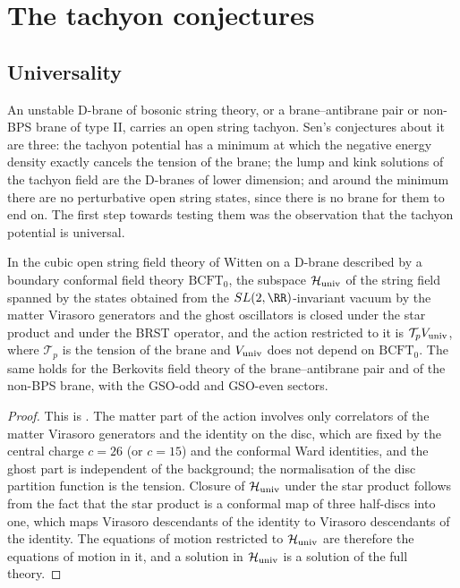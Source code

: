 \section{The tachyon conjectures}\label{sec:tachyon}

\subsection{Universality}\label{ssec:universality}

An unstable D-brane of bosonic string theory, or a brane--antibrane pair or non-BPS brane of type II, carries an open string tachyon. Sen's conjectures about it \cite{Sen98bab,Sen99nonBPS} are three: the tachyon potential has a minimum at which the negative energy density exactly cancels the tension of the brane; the lump and kink solutions of the tachyon field are the D-branes of lower dimension; and around the minimum there are no perturbative open string states, since there is no brane for them to end on. The first step towards testing them was the observation \cite{Sen99univ} that the tachyon potential is universal.

\begin{theorem}\label{thm:universality}
In the cubic open string field theory of Witten on a D-brane described by a boundary conformal field theory $\mathrm{BCFT}_0$, the subspace $\mathcal H_{\rm univ}$ of the string field spanned by the states obtained from the $SL(2,\RR)$-invariant vacuum by the matter Virasoro generators and the ghost oscillators is closed under the star product and under the BRST operator, and the action restricted to it is $\mathcal T_p V_{\rm univ}$, where $\mathcal T_p$ is the tension of the brane and $V_{\rm univ}$ does not depend on $\mathrm{BCFT}_0$. The same holds for the Berkovits field theory of the brane--antibrane pair and of the non-BPS brane, with the GSO-odd and GSO-even sectors.
\end{theorem}

\begin{proof}
This is \cite[Sections~2 and~3]{Sen99univ}. The matter part of the action involves only correlators of the matter Virasoro generators and the identity on the disc, which are fixed by the central charge $c=26$ (or $c=15$) and the conformal Ward identities, and the ghost part is independent of the background; the normalisation of the disc partition function is the tension. Closure of $\mathcal H_{\rm univ}$ under the star product follows from the fact that the star product is a conformal map of three half-discs into one, which maps Virasoro descendants of the identity to Virasoro descendants of the identity. The equations of motion restricted to $\mathcal H_{\rm univ}$ are therefore the equations of motion in it, and a solution in $\mathcal H_{\rm univ}$ is a solution of the full theory.
\end{proof}


